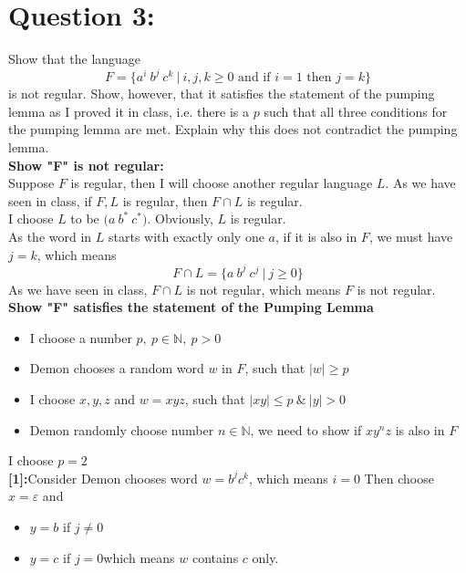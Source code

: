 \documentclass [9 pt]{article}
\theoremstyle{definition}
\begin{document}
\section*{Question 3:}
Show that the language
$$F = \{a^i\ b^j\ c^k \ | \ i,j,k\geq 0 \text{ and if } i = 1 \text{ then }  j = k  \}$$
is not regular. Show, however, that it satisfies the statement of the pumping lemma as I proved it in class, i.e. there is a $p$ such that all three conditions for the pumping lemma are met. Explain why this does not contradict the pumping lemma.\\
\newline
\newline
\textbf{Show "F" is not regular:}\\
Suppose $F$ is regular, then I will choose another regular language $L$. As we have seen in class, if $F, L$ is regular, then $F \cap L$ is regular.\\
I choose $L$ to be $\big( a\ b^* \ c^* \big)$. Obviously, $L$ is regular.\\
As the word in $L$ starts with exactly only one $a$, if it is also in $F$, we must have $j = k$, which means $$F \cap L = \{ a\ b^j\ c^j \ | \ j\geq 0 \}$$
As we have seen in class, $F \cap L$ is not regular, which means $F$ is not regular.\\
\newline\newline\newline
\textbf{Show "F" satisfies the statement of the Pumping Lemma}\\
\begin{itemize}
	\item I choose a number $p,\ p \in \mathbb{N},\ p > 0 $
	\item Demon chooses a random word $w$ in $F$, such that $|w| \geq p$
	\item I choose $x, y, z$ and $w = xyz$, such that $|xy| \leq p\ \&\ |y| >0$
	\item Demon randomly choose number $n \in \mathbb{N}$, we need to show if $x y^n z$ is also in $F$
\end{itemize}
I choose $p = 2$\\\newline
\textbf{[1]:}Consider Demon chooses word $w =  b^{j}c^{k}$, which means $i = 0$ Then choose $x= \varepsilon $ and 
\begin{itemize}
	\item  $y=b$ if $j \neq 0$
	\item  $y=c$ if $j = 0 $\quad which means $w$ contains $c$ only.
\end{itemize} 
\end{document}
